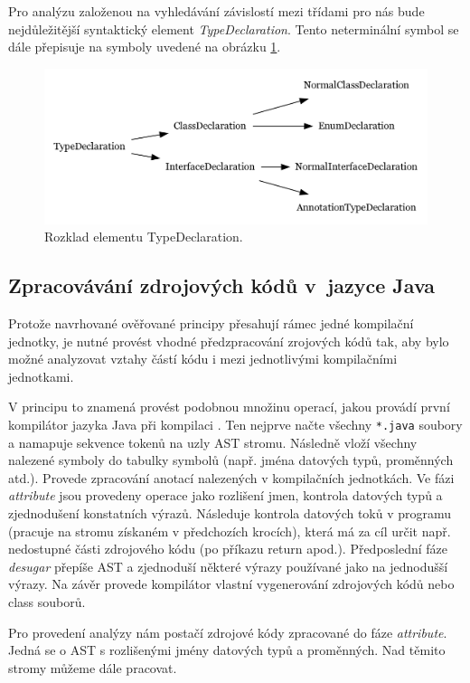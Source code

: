 Pro analýzu založenou na vyhledávání závislostí mezi třídami pro nás bude nejdůležitější syntaktický element \emph{TypeDeclaration}. Tento neterminální symbol se dále přepisuje na symboly uvedené na obrázku \ref{type_declaration_options}.

\begin{figure}[h!]
  \centering
  \includegraphics[width=\textwidth]{./graphs/toplevel_types.png}
  \caption{Rozklad elementu TypeDeclaration.\label{type_declaration_options}}
\end{figure}

\subsection{Zpracovávání zdrojových kódů v~jazyce Java}
Protože navrhované ověřované principy přesahují rámec jedné kompilační jednotky, je nutné provést vhodné předzpracování zrojových kódů tak, aby bylo možné analyzovat vztahy částí kódu i mezi jednotlivými kompilačními jednotkami.

V principu to znamená provést podobnou množinu operací, jakou provádí první kompilátor jazyka Java při kompilaci \cite{hackers_guide_to_javac}. Ten nejprve načte všechny \verb+*.java+ soubory a namapuje sekvence tokenů na uzly AST stromu. Následně vloží všechny nalezené symboly do tabulky symbolů (např. jména datových typů, proměnných atd.). Provede zpracování anotací nalezených v kompilačních jednotkách. Ve fázi \emph{attribute} jsou provedeny operace jako rozlišení jmen, kontrola datových typů a zjednodušení konstatních výrazů. Následuje kontrola datových toků v programu (pracuje na stromu získaném v předchozích krocích), která má za cíl určit např. nedostupné části zdrojového kódu (po příkazu return apod.). Předposlední fáze \emph{desugar} přepíše AST a zjednoduší některé výrazy používané jako  na jednodušší výrazy. Na závěr provede kompilátor vlastní vygenerování zdrojových kódů nebo class souborů.

Pro provedení analýzy nám postačí zdrojové kódy zpracované do fáze \emph{attribute}. Jedná se o AST s rozlišenými jmény datových typů a proměnných. Nad těmito stromy můžeme dále pracovat.

